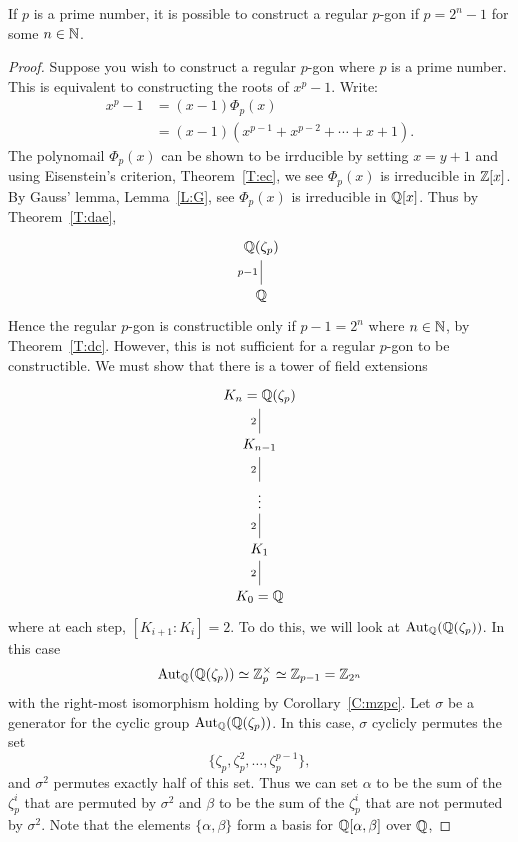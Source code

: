 \documentclass{ximera}
\begin{document}
\begin{theorem}
  If $p$ is a prime number, it is possible to construct a regular
  $p$-gon if $p= 2^n-1$ for some $n\in \mathbb N$.
  \begin{proof}
    Suppose you wish to construct a regular $p$-gon where $p$ is a
    prime number. This is equivalent to constructing the roots of
    $x^p-1$. Write:
    \begin{align*}
      x^{p} -1 &= (x-1) \Phi_{p}(x)\\
      &= (x-1)(x^{p-1} + x^{p-2} + \cdots + x+1).
    \end{align*}
    The polynomail $\Phi_{p}(x)$ can be shown to be irrducible by
    setting $x = y+1$ and using Eisenstein's criterion,
    Theorem~\ref{T:ec}, we see $\Phi_{p}(x)$ is irreducible in
    $\mathbb Z[x]$. By Gauss' lemma, Lemma~\ref{L:G}, see $\Phi_{p}(x)$ is
    irreducible in $\mathbb Q[x]$. Thus by Theorem~\ref{T:dae}, 
    \[
    \begin{tikzcd}
      \Q(\zeta_{p})\\
      \Q\ar[u, -, "p-1"]
    \end{tikzcd}
    \]
    Hence the regular $p$-gon is constructible only if $p-1 = 2^n$
    where $n\in \mathbb N$, by Theorem~\ref{T:dc}. However, this is not
    sufficient for a regular $p$-gon to be constructible. We must show
    that there is a tower of field extensions 
    \[
    \begin{tikzcd}
      K_n=\Q(\zeta_{p})\\
      K_{n-1}\ar[u, -, "2"]\\
      \vdots\ar[u, -, "2"]\\
      K_1\ar[u, -, "2"]\\
      K_0=\Q\ar[u, -, "2"]
    \end{tikzcd}
    \]
    where at each step, $[K_{i+1}:K_i]=2$. To do this, we will look at
    $\operatorname{Aut}_\mathbb Q(\mathbb Q(\zeta_p))$. In this case
    \[
    \operatorname{Aut}_\mathbb Q(\mathbb Q(\zeta_p))\simeq\mathbb Z_p^\times \simeq \mathbb Z_{p-1} = \mathbb Z_{2^n}
    \]
    with the right-most isomorphism holding by
    Corollary~\ref{C:mzpc}. Let $\sigma$ be a generator for the cyclic
    group $\operatorname{Aut}_\mathbb Q(\mathbb Q(\zeta_p))$. In this case, $\sigma$ cyclicly permutes the set
    \[
    \{\zeta_p,\zeta_p^2,\dots,\zeta_p^{p-1}\},
    \]
    and $\sigma^2$ permutes exactly half of this set. Thus we can set
    $\alpha$ to be the sum of the $\zeta_p^i$ that are permuted by
    $\sigma^2$ and $\beta$ to be the sum of the $\zeta_p^i$ that are
    not permuted by $\sigma^2$.  Note that the elements
    $\{\alpha,\beta\}$ form a basis for $\mathbb Q[\alpha,\beta]$ over $\mathbb Q$,

\end{proof}
\end{theorem}
\end{document}
